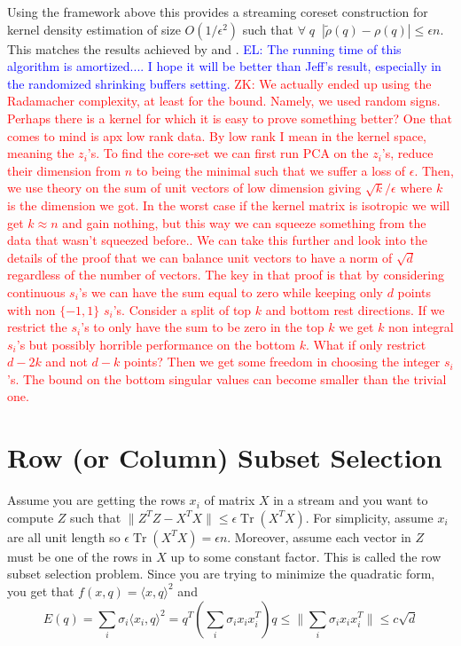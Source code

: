 \documentclass{article} %
\newcommand{\zk}[1]{\textcolor{red}{ZK: #1}}
\newcommand{\el}[1]{\textcolor{blue}{EL: #1}}
\newcommand{\eps}{\epsilon}
\begin{document}
Using the framework above this provides a streaming coreset construction for kernel density estimation of size $O(1/\eps^2)$ such that 
$\forall \;q\;\; |\tilde \rho(q) - \rho(q)| \le \eps n$.
This matches the results achieved by \cite{DBLP:conf/soda/PhillipsT18} and \cite{DBLP:journals/corr/abs-1802-01751}.
\el{The running time of this algorithm is amortized.... I hope it will be better than Jeff's result, especially in the randomized shrinking buffers setting.}
\zk{We actually ended up using the Radamacher complexity, at least for the bound. Namely, we used random signs. Perhaps there is a kernel for which it is easy to prove something better? One that comes to mind is apx low rank data. By low rank I mean in the kernel space, meaning the $z_i$'s. To find the core-set we can first run PCA on the $z_i$'s, reduce their dimension from $n$ to being the minimal such that we suffer a loss of $\eps$. Then, we use theory on the sum of unit vectors of low dimension giving $\sqrt{k}/\eps$ where $k$ is the dimension we got. In the worst case if the kernel matrix is isotropic we will get $k \approx n$ and gain nothing, but this way we can squeeze something from the data that wasn't squeezed before.. We can take this further and look into the details of the proof that we can balance unit vectors to have a norm of $\sqrt{d}$ regardless of the number of vectors. The key in that proof is that by considering continuous $s_i$'s we can have the sum equal to zero while keeping only $d$ points with non $\{-1,1\}$ $s_i$'s. Consider a split of top $k$ and bottom rest directions. If we restrict the $s_i$'s to only have the sum to be zero in the top $k$ we get $k$ non integral $s_i$'s but possibly horrible performance on the bottom $k$. What if only restrict $d-2k$ and not $d-k$ points? Then we get some freedom in choosing the integer $s_i$'s. The bound on the bottom singular values can become smaller than the trivial one.}







\section{Row (or Column) Subset Selection}
Assume you are getting the rows $x_i$  of matrix $X$ in a stream and you want to compute $Z$ such that $\|Z^TZ - X^TX\| \le \eps \operatorname{Tr}(X^TX)$.
For simplicity, assume $x_i$ are all unit length so $\eps \operatorname{Tr}(X^TX) = \eps n$. Moreover, assume each vector in $Z$ must be one of the rows in $X$ up to some constant factor.
This is called the row subset selection problem. 
Since you are trying to minimize the quadratic form, you get that $f(x, q) = \langle x,q \rangle ^2$ and 
$$E(q) = \sum_i \sigma_i \langle x_i,q \rangle ^2 = q^T (\sum_i \sigma_i x_i x_i^T ) q \le \|\sum_i \sigma_i x_i x_i^T\| \le c\sqrt{d}$$
\end{document}
